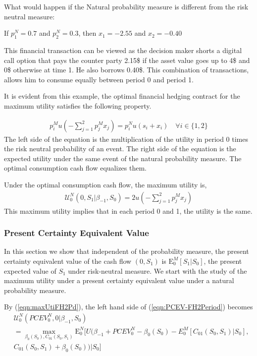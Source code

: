 \documentclass{article}[12pt letter]
\newcommand{\E}{\mathrm{E}}
\begin{document}
What would happen if the Natural probability measure is different from the risk neutral measure:

{\example If $p^N_1 = 0.7$ and $p_2^N =0.3$, then $x_1 = -2.55$ and $x_2 = -0.40$ }

This financial transaction can be viewed as the decision maker shorts a digital call option that pays the counter party 2.15\$ if the asset value goes up to 4\$ and 0\$ otherwise at time 1. He also borrows 0.40\$. This combination of transactions, allows him to consume equally between period 0 and period 1.

It is evident from this example, the optimal financial hedging contract for the maximum utility satisfies the following property. 

\begin{align} \label{eqn:fonc-cash}
p_i^Mu(-\sum_{j=1}^2 p_j^M x_j) = p_i^N u(s_i + x_i)\quad  \forall i \in \{1,2\}
\end{align}
The left side of the equation is the multiplication of the utility in period 0 times the risk neutral probability of an event. The right side of the equation is the expected utility under the same event of the natural probability measure. The optimal consumption cash flow equalizes them.  

Under the optimal consumption cash flow, the maximum utility is,
\begin{align} \label{eqn:maxU-cash}
\mathcal{U}^N_0 (0, S_1|\beta_{-1},S_0)  = 2u(-\sum_{j=1}^2 p_j^M x_j) 
\end{align}
This maximum utility implies that in each period 0 and 1, the utility is the same. 

\subsubsection{ Present Certainty Equivalent Value}
In this section we show that independent of the probability measure, the present certainty equivalent value of the cash flow $(0, S_1)$ is  $\E_0^M [S_1|S_0]$, the present expected value of $S_1$ under risk-neutral measure. We start with the study of the maximum utility under a present certainty equivalent value under a natural probability measure.

By (\ref{eqn:maxUtiFH2Pd}), the left hand side of (\ref{eqn:PCEV-FH2Period}) becomes
\begin{align*}
&\mathcal{U}^N_0 (PCEV_0^N, 0|\beta_{-1},S_0)  \nonumber \\&= \max_{\beta_0(S_0), C_{01}(S_0,S_1)} \E_0^N [U(\beta_{-1} + PCEV_0^N - \beta_0(S_0) - E_0^M[C_{01}(S_0,S_1)|S_0], \\&C_{01}(S_0,S_1) + \beta_0(S_0))|S_0]
\end{align*}
\end{document}
